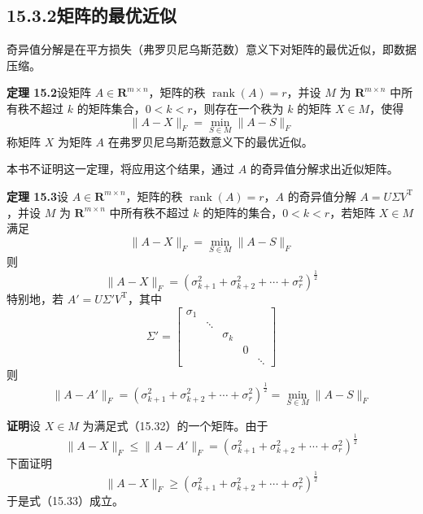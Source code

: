 \documentclass[UTF8, 12pt, fontset=fandol, oneside]{ctexart}
\begin{document}
\subsection*{15.3.2\quad 矩阵的最优近似}

奇异值分解是在平方损失（弗罗贝尼乌斯范数）意义下对矩阵的最优近似，即数据压缩。

\noindent\textbf{定理 15.2}\quad 设矩阵 $A\in\mathbf{R}^{m\times n}$，矩阵的秩 $\operatorname{rank}(A)=r$，并设 $M$ 为 $\mathbf{R}^{m\times n}$ 中所有秩不超过 $k$ 的矩阵集合，$0<k<r$，则存在一个秩为 $k$ 的矩阵 $X\in M$，使得
\begin{equation}
\|A-X\|_F=\min_{S\in M}\|A-S\|_F
\tag{15.31}
\end{equation}
称矩阵 $X$ 为矩阵 $A$ 在弗罗贝尼乌斯范数意义下的最优近似。

本书不证明这一定理，将应用这个结果，通过 $A$ 的奇异值分解求出近似矩阵。

\noindent\textbf{定理 15.3}\quad 设 $A\in\mathbf{R}^{m\times n}$，矩阵的秩 $\operatorname{rank}(A)=r$，$A$ 的奇异值分解 $A=U\Sigma V^{\mathrm{T}}$，并设 $M$ 为 $\mathbf{R}^{m\times n}$ 中所有秩不超过 $k$ 的矩阵的集合，$0<k<r$，若矩阵 $X\in M$ 满足
\begin{equation}
\|A-X\|_F=\min_{S\in M}\|A-S\|_F
\tag{15.32}
\end{equation}
则
\begin{equation}
\|A-X\|_F=(\sigma_{k+1}^2+\sigma_{k+2}^2+\cdots+\sigma_r^2)^{\frac12}
\tag{15.33}
\end{equation}
特别地，若 $A'=U\Sigma'V^{\mathrm{T}}$，其中
\[
\Sigma'=
\begin{bmatrix}
\sigma_1&&&&\\
&\ddots&&&\\
&&\sigma_k&&\\
&&&0&\\
&&&&\ddots
\end{bmatrix}
\]
则
\begin{equation}
\|A-A'\|_F=(\sigma_{k+1}^2+\sigma_{k+2}^2+\cdots+\sigma_r^2)^{\frac12}
=\min_{S\in M}\|A-S\|_F
\tag{15.34}
\end{equation}

\noindent\textbf{证明}\quad 设 $X\in M$ 为满足式（15.32）的一个矩阵。由于
\begin{equation}
\|A-X\|_F\leqslant\|A-A'\|_F
=(\sigma_{k+1}^2+\sigma_{k+2}^2+\cdots+\sigma_r^2)^{\frac12}
\tag{15.35}
\end{equation}
下面证明
\[
\|A-X\|_F\geqslant(\sigma_{k+1}^2+\sigma_{k+2}^2+\cdots+\sigma_r^2)^{\frac12}
\]
于是式（15.33）成立。
\end{document}

